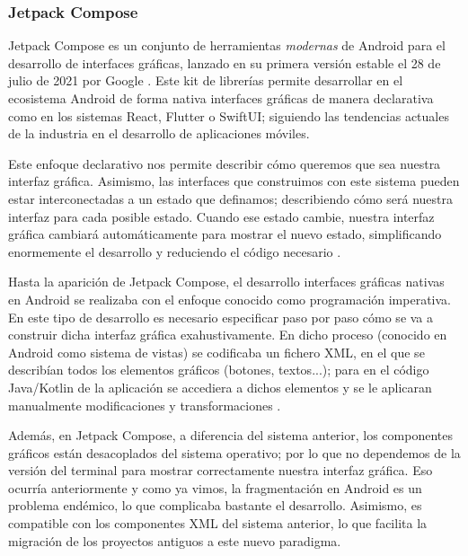         \subsubsection{Jetpack Compose}

            Jetpack Compose es un conjunto de herramientas \textit{modernas} de Android para el desarrollo de 
            interfaces gráficas, lanzado en su primera versión estable el 28 de julio de 2021 por Google
            \cite{bellini_jetpack_2021}. Este kit de librerías permite desarrollar en el ecosistema Android de 
            forma nativa interfaces gráficas de manera declarativa como en los sistemas React, Flutter o SwiftUI;
            siguiendo las tendencias actuales de la industria en el desarrollo de aplicaciones móviles. 

            Este enfoque declarativo nos permite describir cómo queremos que sea nuestra interfaz gráfica. 
            Asimismo, las interfaces que construimos con este sistema pueden estar interconectadas a un estado 
            que definamos; describiendo cómo será nuestra interfaz para cada posible estado. Cuando ese estado cambie, 
            nuestra interfaz gráfica cambiará automáticamente para mostrar el nuevo estado, simplificando enormemente 
            el desarrollo y reduciendo el código necesario \cite{leiva_que_2021}. 

            Hasta la aparición de Jetpack Compose, el desarrollo interfaces gráficas nativas en Android se realizaba 
            con el enfoque conocido como programación imperativa. En este tipo de desarrollo es necesario especificar 
            paso por paso cómo se va a construir dicha interfaz gráfica exahustivamente. En dicho proceso (conocido 
            en Android como sistema de vistas) se codificaba un fichero XML, en el que se describían todos los 
            elementos gráficos (botones, textos...); para en el código Java/Kotlin de la aplicación se accediera 
            a dichos elementos y se le aplicaran manualmente modificaciones y transformaciones 
            \cite{noauthor_programacion_2021}.

            Además, en Jetpack Compose, a diferencia del sistema anterior, los componentes gráficos están desacoplados 
            del sistema operativo; por lo que no dependemos de la versión del terminal para mostrar correctamente 
            nuestra interfaz gráfica. Eso ocurría anteriormente y como ya vimos, la fragmentación en Android es un 
            problema endémico, lo que complicaba bastante el desarrollo. Asimismo, es compatible con los componentes XML 
            del sistema anterior, lo que facilita la migración de los proyectos antiguos a este nuevo paradigma. 

